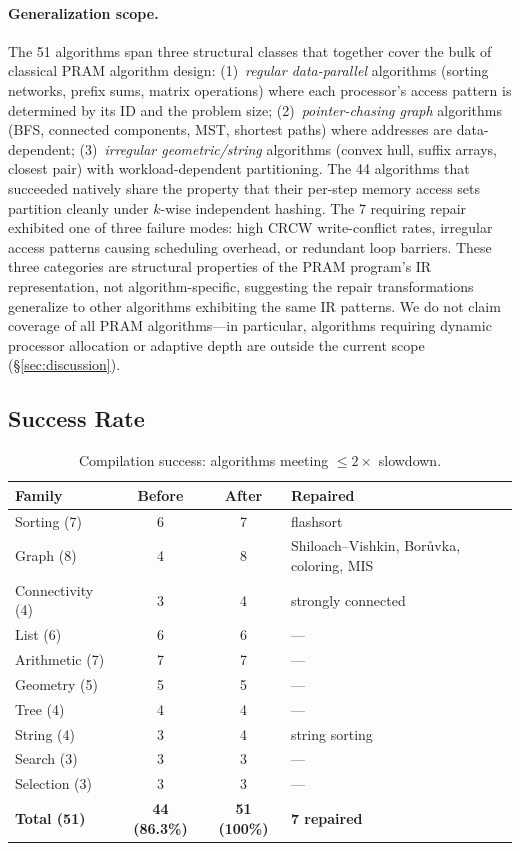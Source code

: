 \documentclass[11pt]{article}
\begin{document}
\paragraph{Generalization scope.}
The 51 algorithms span three structural classes that together cover
the bulk of classical PRAM algorithm design:
(1)~\emph{regular data-parallel} algorithms (sorting networks, prefix sums,
matrix operations) where each processor's access pattern is determined
by its ID and the problem size;
(2)~\emph{pointer-chasing graph} algorithms (BFS, connected components,
MST, shortest paths) where addresses are data-dependent;
(3)~\emph{irregular geometric/string} algorithms (convex hull, suffix
arrays, closest pair) with workload-dependent partitioning.
The 44 algorithms that succeeded natively share the property that their
per-step memory access sets partition cleanly under $k$-wise independent
hashing.  The 7 requiring repair exhibited one of three failure modes:
high CRCW write-conflict rates, irregular access patterns causing
scheduling overhead, or redundant loop barriers.  These three categories
are structural properties of the PRAM program's IR representation, not
algorithm-specific, suggesting the repair transformations generalize to
other algorithms exhibiting the same IR patterns.
We do not claim coverage of all PRAM algorithms---in particular,
algorithms requiring dynamic processor allocation or adaptive depth
are outside the current scope (\S\ref{sec:discussion}).

\subsection{Success Rate}

\begin{table}[t]
\centering
\caption{Compilation success: algorithms meeting $\le 2\times$ slowdown.}
\label{tab:success}
\begin{tabular}{@{}lccl@{}}
\toprule
\textbf{Family} & \textbf{Before} & \textbf{After} & \textbf{Repaired} \\
\midrule
Sorting (7) & 6 & 7 & flashsort \\
Graph (8) & 4 & 8 & Shiloach--Vishkin, Bor\r{u}vka, coloring, MIS \\
Connectivity (4) & 3 & 4 & strongly connected \\
List (6) & 6 & 6 & --- \\
Arithmetic (7) & 7 & 7 & --- \\
Geometry (5) & 5 & 5 & --- \\
Tree (4) & 4 & 4 & --- \\
String (4) & 3 & 4 & string sorting \\
Search (3) & 3 & 3 & --- \\
Selection (3) & 3 & 3 & --- \\
\midrule
\textbf{Total (51)} & \textbf{44 (86.3\%)} & \textbf{51 (100\%)} & \textbf{7 repaired} \\
\bottomrule
\end{tabular}
\end{table}
\end{document}
